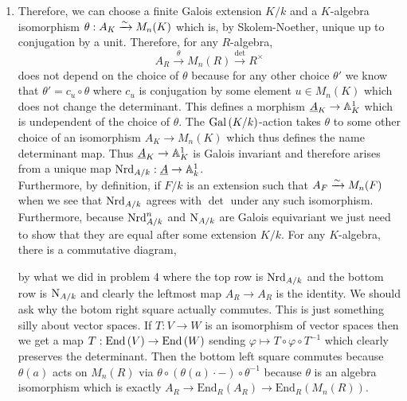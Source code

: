 \documentclass[12pt]{article}
\begin{document}
\begin{enumerate}
\item Therefore, we can choose a finite Galois extension $K/k$ and a $K$-algebra isomorphism $\theta : A_K \xrightarrow{\sim} M_n(K)$ which is, by Skolem-Noether, unique up to conjugation by a unit. Therefore, for any $R$-algebra,
\[ A_R \xrightarrow{\theta} M_n(R) \xrightarrow{\det} R^\times \]
does not depend on the choice of $\theta$ because for any other choice $\theta'$ we know that $\theta' = c_u \circ \theta$ where $c_u$ is conjugation by some element $u \in M_n(K)$ which does not change the determinant. This defines a morphism $\underline{A}_K \to \mathbb{A}^1_K$ which is undependent of the choice of $\theta$. The $\mathrm{Gal}\left( K/k \right)$-action takes $\theta$ to some other choice of an isomorphism $A_K \to M_n(K)$ which thus defines the name determinant map. Thus $\underline{A}_K \to \mathbb{A}^1_K$ is Galois invariant and therefore arises from a unique map $\mathrm{Nrd}_{A/k} : \underline{A} \to \mathbb{A}^1_k$.
\bigskip\\
Furthermore, by definition, if $F/k$ is an extension such that $A_F \xrightarrow{\sim} M_n(F)$ when we see that $\mathrm{Nrd}_{A/k}$ agrees with $\det$ under any such isomorphism.
\bigskip\\
Furthermore, because $\mathrm{Nrd}_{A/k}^n$ and $\mathrm{N}_{A/k}$ are Galois equivariant we just need to show that they are equal after some extension $K/k$. For any $K$-algebra, there is a commutative diagram,
\begin{center}
\end{center}
by what we did in problem 4 where the top row is $\mathrm{Nrd}_{A/k}$ and the bottom row is $\mathrm{N}_{A/k}$ and clearly the leftmost map $A_R \to A_R$ is the identity. We should ask why the botom right square actually commutes. This is just something silly about vector spaces. If $T : V \to W$ is an isomorphism of vector spaces then we get a map $T : \mathrm{End}\left( V \right) \to \mathrm{End}\left( W \right)$ sending $\varphi \mapsto T \circ \varphi \circ T^{-1}$ which clearly preserves the determinant. Then the bottom left square commutes because $\theta(a)$ acts on $M_n(R)$ via $\theta \circ (\theta(a) \cdot -) \circ \theta^{-1}$ because $\theta$ is an algebra isomorphism which is exactly $A_R \to \mathrm{End}_R(A_R) \to \mathrm{End}_R(M_n(R))$.

\end{enumerate}
\end{document}
